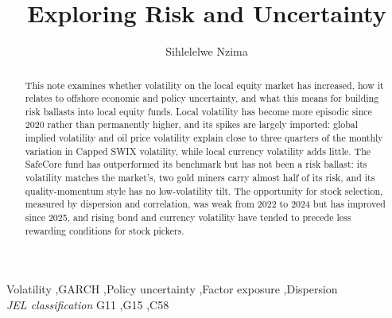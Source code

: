 \documentclass[11pt,preprint]{elsarticle}
\numberwithin{equation}{section}
\numberwithin{figure}{section}
\numberwithin{table}{section}
\begin{document}
\begin{frontmatter}  %

\title{Exploring Risk and Uncertainty}





\author[Add1]{Sihlelelwe Nzima}
\ead{}





\address[Add1]{Stellenbosch University, Stellenbosch, South Africa}


\begin{abstract}
\small{
This note examines whether volatility on the local equity market has
increased, how it relates to offshore economic and policy uncertainty,
and what this means for building risk ballasts into local equity funds.
Local volatility has become more episodic since 2020 rather than
permanently higher, and its spikes are largely imported: global implied
volatility and oil price volatility explain close to three quarters of
the monthly variation in Capped SWIX volatility, while local currency
volatility adds little. The SafeCore fund has outperformed its benchmark
but has not been a risk ballast: its volatility matches the market's,
two gold miners carry almost half of its risk, and its quality-momentum
style has no low-volatility tilt. The opportunity for stock selection,
measured by dispersion and correlation, was weak from 2022 to 2024 but
has improved since 2025, and rising bond and currency volatility have
tended to precede less rewarding conditions for stock pickers.
}
\end{abstract}

\vspace{1cm}


\begin{keyword}
\footnotesize{
Volatility \sep GARCH \sep Policy uncertainty \sep Factor exposure
\sep Dispersion \\
\vspace{0.3cm}
}
\footnotesize{
\textit{JEL classification} G11 \sep G15 \sep C58
}
\end{keyword}



\vspace{0.5cm}

\end{frontmatter}

\setcounter{footnote}{0}
\end{document}
